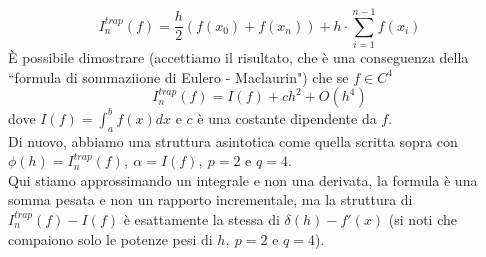 \[
I_n^{trap} (f) = \frac{h}{2} (f(x_0) + f(x_n)) + h \cdot \sum_{i=1}^{n-1} f(x_i)
\]
È possibile dimostrare (accettiamo il risultato, che è una conseguenza della ``formula di sommaziione di Eulero - Maclaurin") che se $f \in C^4$
\[
I_n^{trap} (f) = I(f) + ch^2 + O(h^4)
\]
dove $I(f) = \int_a^b f(x) dx$ e $c$ è una costante dipendente da $f$.\\
Di nuovo, abbiamo una struttura asintotica come quella scritta sopra con $\phi (h) = I_n^{trap} (f), \ \alpha = I(f), \ p=2$ e $q=4$.\\
Qui stiamo approssimando un integrale e non una derivata, la formula è una somma pesata e non un rapporto incrementale, ma la struttura di $I_n^{trap} (f) - I(f)$ è esattamente la stessa di $\delta (h) - f'(x)$ (si noti che compaiono solo le potenze pesi di $h, \ p=2$ e $q=4$).


